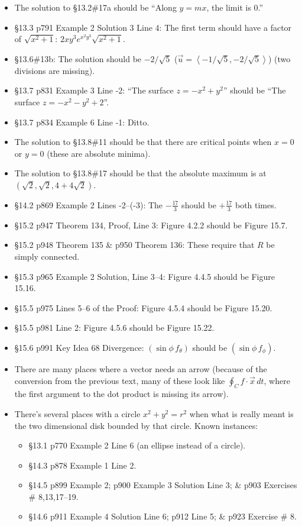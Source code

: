 \documentclass{amsart}
\newcommand{\bracket}[1]{\left\langle#1\right\rangle}
\begin{document}
\begin{itemize}
\item The solution to \S13.2\#17a should be ``Along $y=mx$, the limit is 0.''
\item \S13.3 p791 Example 2 Solution 3 Line 4: The first term should have a factor of $\sqrt{x^2+1}$: $2xy^3e^{x^2y^3}\sqrt{x^2+1}$.
\item \S13.6\#13b: The solution should be $-2/\sqrt5$ ($\vec u =\bracket{-1/\sqrt5,-2/\sqrt5}$) (two divisions are missing).
\item \S13.7 p831 Example 3 Line -2: ``The surface $z=-x^2+y^2$'' should be ``The surface $z=-x^2-y^2+2$''.
\item \S13.7 p834 Example 6 Line -1: Ditto.
\item The solution to \S13.8\#11 should be that there are critical points when $x=0$ or $y=0$ (these are absolute minima).
\item The solution to \S13.8\#17 should be that the absolute maximum is at $(\sqrt2,\sqrt2,4+4\sqrt2)$.
\item \S14.2 p869 Example 2 Lines -2--(-3): The $-\frac{17}3$ should be $+\frac{17}3$ both times.
\item \S15.2 p947 Theorem 134, Proof, Line 3: Figure 4.2.2 should be Figure 15.7.
\item \S15.2 p948 Theorem 135 \& p950 Theorem 136: These require that $R$ be simply connected.
\item \S15.3 p965 Example 2 Solution, Line 3--4: Figure 4.4.5 should be Figure 15.16.
\item \S15.5 p975 Lines 5--6 of the Proof: Figure 4.5.4 should be Figure 15.20.
\item \S15.5 p981 Line 2: Figure 4.5.6 should be Figure 15.22.
\item \S15.6 p991 Key Idea 68 Divergence: $(\sin \phi \,f_{\theta})$ should be $(\sin \phi \,f_{\phi})$.
\item There are many places where a vector needs an arrow (because of the conversion from the previous text, many of these look like $\oint_C f\cdot\vec x\,dt$, where the first argument to the dot product is missing its arrow).
\item There's several places with a circle $x^2+y^2=r^2$ when what is really meant is the two dimensional disk bounded by that circle.  Known instances:
\begin{itemize}
\item \S13.1 p770 Example 2 Line 6 (an ellipse instead of a circle).
\item \S14.3 p878 Example 1 Line 2.
\item \S14.5 p899 Example 2; p900 Example 3 Solution Line 3; \& p903 Exercises \# 8,13,17--19.
\item \S14.6 p911 Example 4 Solution Line 6; p912 Line 5; \& p923 Exercise \# 8.
\end{itemize}
\end{itemize}
\end{document}
